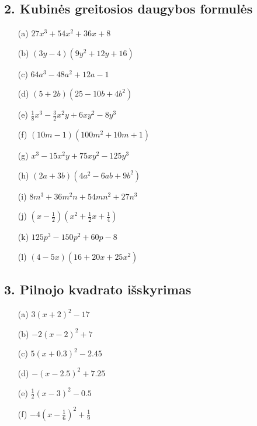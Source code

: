 \documentclass[12pt, a4paper]{article}
\begin{document}
\subsection*{2. Kubinės greitosios daugybos formulės}
\begin{multicols}{2}
\begin{enumerate}
    \item[(a)] $27x^3 + 54x^2 + 36x + 8$
    \item[(b)] $(3y - 4)(9y^2 + 12y + 16)$
    \item[(c)] $64a^3 - 48a^2 + 12a - 1$
    \item[(d)] $(5 + 2b)(25 - 10b + 4b^2)$
    \item[(e)] $\frac{1}{8}x^3 - \frac{3}{2}x^2y + 6xy^2 - 8y^3$
    \item[(f)] $(10m - 1)(100m^2 + 10m + 1)$
    \item[(g)] $x^3 - 15x^2y + 75xy^2 - 125y^3$
    \item[(h)] $(2a + 3b)(4a^2 - 6ab + 9b^2)$
    \item[(i)] $8m^3 + 36m^2n + 54mn^2 + 27n^3$
    \item[(j)] $(x - \frac{1}{2})(x^2 + \frac{1}{2}x + \frac{1}{4})$
    \item[(k)] $125p^3 - 150p^2 + 60p - 8$
    \item[(l)] $(4 - 5x)(16 + 20x + 25x^2)$
\end{enumerate}
\end{multicols}

\subsection*{3. Pilnojo kvadrato išskyrimas}
\begin{multicols}{2}
\begin{enumerate}
    \item[(a)] $3(x + 2)^2 - 17$
    \item[(b)] $-2(x - 2)^2 + 7$
    \item[(c)] $5(x + 0.3)^2 - 2.45$
    \item[(d)] $-(x - 2.5)^2 + 7.25$
    \item[(e)] $\frac{1}{2}(x - 3)^2 - 0.5$
    \item[(f)] $-4\left(x - \frac{1}{6}\right)^2 + \frac{1}{9}$
\end{enumerate}
\end{multicols}
\end{document}
